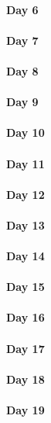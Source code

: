 \documentclass[UTF8,a4paper,8pt]{ctexart}
\begin{document}
 	 \paragraph{Day 6       \quad     }
 	 \paragraph{Day 7       \quad     }
 	 \paragraph{Day 8       \quad     }
 	 \paragraph{Day 9       \quad     }
 	 \paragraph{Day 10      \quad     }
 	 \paragraph{Day 11      \quad     }
 	 \paragraph{Day 12      \quad     }
 	 \paragraph{Day 13      \quad     }
 	 \paragraph{Day 14      \quad     }
 	 \paragraph{Day 15      \quad     }
 	 \paragraph{Day 16      \quad     }
 	 \paragraph{Day 17      \quad     }
 	 \paragraph{Day 18      \quad     }
 	 \paragraph{Day 19      \quad     }
\end{document}
